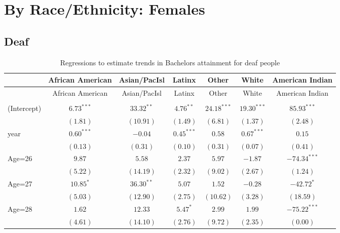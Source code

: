 \documentclass[fullpage]{paper}
\begin{document}
\section{ By Race/Ethnicity: Females }

\subsection{ Deaf }

\begin{center}
\begin{longtable}{l c c c c c c }
\hline
 & African American & Asian/PacIsl & Latinx & Other & White & American Indian \\
\hline
\endfirsthead
\hline
 & African American & Asian/PacIsl & Latinx & Other & White & American Indian \\
\hline
\endhead
\hline
\endfoot
\hline
\multicolumn{7}{l}{\scriptsize{$^{***}p<0.001$, $^{**}p<0.01$, $^*p<0.05$}}\\
\caption{Regressions to estimate trends in Bachelors attainment for deaf people}
\label{table:coefficients}
\endlastfoot
(Intercept) & $6.73^{***}$ & $33.32^{**}$ & $4.76^{**}$  & $24.18^{***}$ & $19.30^{***}$ & $85.93^{***}$  \\
            & $(1.81)$     & $(10.91)$    & $(1.49)$     & $(6.81)$      & $(1.37)$      & $(2.48)$       \\
year        & $0.60^{***}$ & $-0.04$      & $0.45^{***}$ & $0.58$        & $0.67^{***}$  & $0.15$         \\
            & $(0.13)$     & $(0.31)$     & $(0.10)$     & $(0.31)$      & $(0.07)$      & $(0.41)$       \\
Age=26      & $9.87$       & $5.58$       & $2.37$       & $5.97$        & $-1.87$       & $-74.34^{***}$ \\
            & $(5.22)$     & $(14.19)$    & $(2.32)$     & $(9.02)$      & $(2.67)$      & $(1.24)$       \\
Age=27      & $10.85^{*}$  & $36.30^{**}$ & $5.07$       & $1.52$        & $-0.28$       & $-42.72^{*}$   \\
            & $(5.03)$     & $(12.90)$    & $(2.75)$     & $(10.62)$     & $(3.28)$      & $(18.59)$      \\
Age=28      & $1.62$       & $12.33$      & $5.47^{*}$   & $2.99$        & $1.99$        & $-75.22^{***}$ \\
            & $(4.61)$     & $(14.10)$    & $(2.76)$     & $(9.72)$      & $(2.35)$      & $(0.00)$       \\

\end{longtable}
\end{center}
\end{document}
